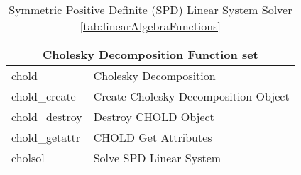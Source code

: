 \begin{table}[H]
\caption{Symmetric Positive Definite (SPD) Linear System Solver  \ref{tab:linearAlgebraFunctions}}
\label{tab:symmetricPositiveDefiniteSolvers}
\begin{center}
\begin{tabular}{|l|l|}
\multicolumn{2}{c}{\hyperlink{cholFunc}{\rmfamily \bfseries Cholesky Decomposition Function set}}\\
\hline
chold & Cholesky Decomposition\\
chold\_create & Create Cholesky Decomposition Object\\
chold\_destroy & Destroy CHOLD Object\\
chold\_getattr & CHOLD Get Attributes\\
cholsol & Solve SPD Linear System\\
\hline\end{tabular}
\end{center}
\label{default}
\end{table}%